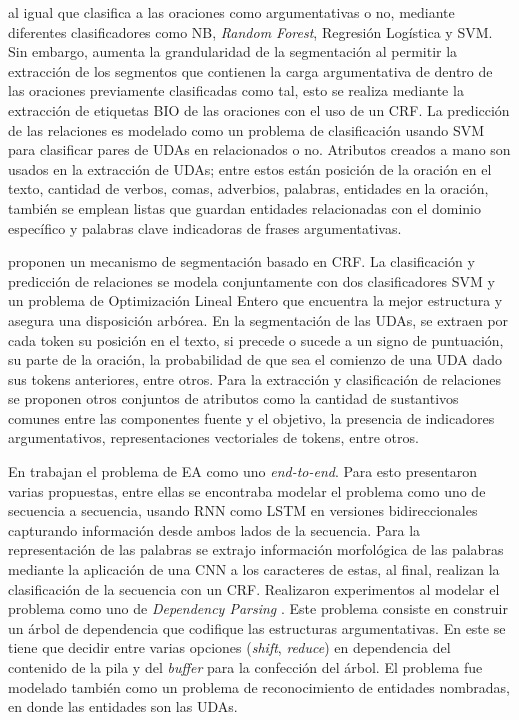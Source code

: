\documentclass[a4paper,11pt,twocolumn,twoside]{article}
\begin{document}
\cite{goudas2015argument} al igual que \cite{palau2009argumentation} clasifica a las oraciones como
argumentativas o no, mediante diferentes clasificadores como NB, \textit{Random Forest}, Regresión
Logística y SVM. Sin embargo, \cite{goudas2015argument} aumenta la grandularidad de la segmentación al permitir
la extracción de los segmentos que contienen la carga argumentativa de dentro de las oraciones previamente clasificadas
como tal, esto se realiza mediante la extracción de etiquetas BIO de las oraciones con el uso de un 
CRF. La predicción de las relaciones es modelado como un problema de clasificación
usando SVM para clasificar pares de UDAs en relacionados o no. Atributos creados a mano 
son usados en la extracción de UDAs; entre estos están posición de la oración en el texto, cantidad de verbos, comas, adverbios,
palabras, entidades en la oración, también se emplean listas que guardan entidades relacionadas con el dominio 
específico y palabras clave indicadoras de frases argumentativas. 

\cite{stab2017parsing} proponen un mecanismo de segmentación basado en CRF. La clasificación
y predicción de relaciones se modela conjuntamente con dos clasificadores SVM y un problema
de Optimización Lineal Entero que encuentra la mejor estructura y asegura una disposición arbórea. En la segmentación
de las UDAs, se extraen por cada token su posición en el texto, si precede o sucede a un signo de puntuación, su parte de
la oración, la probabilidad de que sea el comienzo de una UDA dado sus tokens anteriores, entre otros. Para la extracción
y clasificación de relaciones se proponen otros conjuntos de atributos como la cantidad de sustantivos comunes entre
las componentes fuente y el objetivo, la presencia de indicadores argumentativos, representaciones vectoriales de tokens,
entre otros.

En \cite{eger2017neural} trabajan el problema de EA como uno \textit{end-to-end}. 
Para esto presentaron varias propuestas, entre ellas se encontraba
modelar el problema como uno de secuencia a secuencia, usando RNN como 
LSTM en versiones bidireccionales capturando información desde ambos lados de la secuencia.
Para la representación de las palabras se extrajo información morfológica de las palabras mediante 
la aplicación de una CNN a los caracteres de estas,
al final, realizan la clasificación de la secuencia con un CRF. 
Realizaron experimentos al modelar el problema como uno de \textit{Dependency Parsing} \cite{kiperwasser2016simple}. Este problema
consiste en construir un árbol de dependencia que codifique las estructuras argumentativas. En este 
se tiene que decidir entre varias opciones (\textit{shift}, \textit{reduce}) en dependencia del contenido de la pila y del \textit{buffer}
para la confección del árbol.
El problema fue modelado también como un problema de reconocimiento de entidades nombradas, en donde las entidades son las UDAs.
\end{document}
